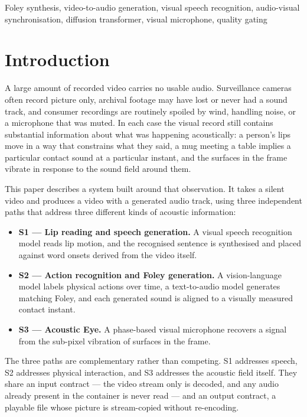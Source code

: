 \documentclass[conference]{IEEEtran}
\begin{document}
\begin{IEEEkeywords}
Foley synthesis, video-to-audio generation, visual speech recognition, audio-visual
synchronisation, diffusion transformer, visual microphone, quality gating
\end{IEEEkeywords}

\section{Introduction}

A large amount of recorded video carries no usable audio. Surveillance cameras
often record picture only, archival footage may have lost or never had a sound
track, and consumer recordings are routinely spoiled by wind, handling noise, or
a microphone that was muted. In each case the visual record still contains
substantial information about what was happening acoustically: a person's lips
move in a way that constrains what they said, a mug meeting a table implies a
particular contact sound at a particular instant, and the surfaces in the frame
vibrate in response to the sound field around them.

This paper describes a system built around that observation. It takes a silent
video and produces a video with a generated audio track, using three independent
paths that address three different kinds of acoustic information:

\begin{itemize}
\item \textbf{S1 --- Lip reading and speech generation.} A visual speech
      recognition model reads lip motion, and the recognised sentence is
      synthesised and placed against word onsets derived from the video itself.
\item \textbf{S2 --- Action recognition and Foley generation.} A vision-language
      model labels physical actions over time, a text-to-audio model generates
      matching Foley, and each generated sound is aligned to a visually measured
      contact instant.
\item \textbf{S3 --- Acoustic Eye.} A phase-based visual microphone recovers a
      signal from the sub-pixel vibration of surfaces in the frame.
\end{itemize}

The three paths are complementary rather than competing. S1 addresses speech, S2
addresses physical interaction, and S3 addresses the acoustic field itself. They
share an input contract --- the video stream only is decoded, and any audio
already present in the container is never read --- and an output contract, a
playable file whose picture is stream-copied without re-encoding.
\end{document}
